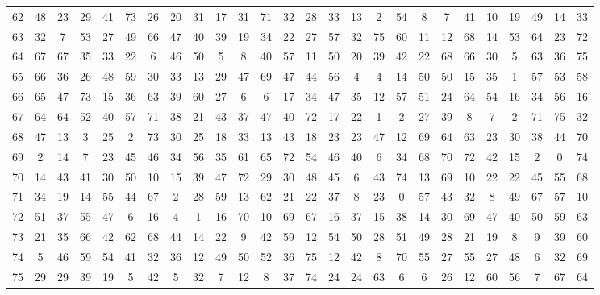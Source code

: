 \begin{table}
\begin{tabular}{c c c c c c c c c c c c c c c c c c c c c c c c c c }
62 & 48 & 23 & 29 & 41 & 73 & 26 & 20 & 31 & 17 & 31 & 71 & 32 & 28 & 33 & 13 & 2 & 54 & 8 & 7 & 41 & 10 & 19 & 49 & 14 & 33 \\
63 & 32 & 7 & 53 & 27 & 49 & 66 & 47 & 40 & 39 & 19 & 34 & 22 & 27 & 57 & 32 & 75 & 60 & 11 & 12 & 68 & 14 & 53 & 64 & 23 & 72 \\
64 & 67 & 67 & 35 & 33 & 22 & 6 & 46 & 50 & 5 & 8 & 40 & 57 & 11 & 50 & 20 & 39 & 42 & 22 & 68 & 66 & 30 & 5 & 63 & 36 & 75 \\
65 & 66 & 36 & 26 & 48 & 59 & 30 & 33 & 13 & 29 & 47 & 69 & 47 & 44 & 56 & 4 & 4 & 14 & 50 & 50 & 15 & 35 & 1 & 57 & 53 & 58 \\
66 & 65 & 47 & 73 & 15 & 36 & 63 & 39 & 60 & 27 & 6 & 6 & 17 & 34 & 47 & 35 & 12 & 57 & 51 & 24 & 64 & 54 & 16 & 34 & 56 & 16 \\
67 & 64 & 64 & 52 & 40 & 57 & 71 & 38 & 21 & 43 & 37 & 47 & 40 & 72 & 17 & 22 & 1 & 2 & 27 & 39 & 8 & 7 & 2 & 71 & 75 & 32 \\
68 & 47 & 13 & 3 & 25 & 2 & 73 & 30 & 25 & 18 & 33 & 13 & 43 & 18 & 23 & 23 & 47 & 12 & 69 & 64 & 63 & 23 & 30 & 38 & 44 & 70 \\
69 & 2 & 14 & 7 & 23 & 45 & 46 & 34 & 56 & 35 & 61 & 65 & 72 & 54 & 46 & 40 & 6 & 34 & 68 & 70 & 72 & 42 & 15 & 2 & 0 & 74 \\
70 & 14 & 43 & 41 & 30 & 50 & 10 & 15 & 39 & 47 & 72 & 29 & 30 & 48 & 45 & 6 & 43 & 74 & 13 & 69 & 10 & 22 & 22 & 45 & 55 & 68 \\
71 & 34 & 19 & 14 & 55 & 44 & 67 & 2 & 28 & 59 & 13 & 62 & 21 & 22 & 37 & 8 & 23 & 0 & 57 & 43 & 32 & 8 & 49 & 67 & 57 & 10 \\
72 & 51 & 37 & 55 & 47 & 6 & 16 & 4 & 1 & 16 & 70 & 10 & 69 & 67 & 16 & 37 & 15 & 38 & 14 & 30 & 69 & 47 & 40 & 50 & 59 & 63 \\
73 & 21 & 35 & 66 & 42 & 62 & 68 & 44 & 14 & 22 & 9 & 42 & 59 & 12 & 54 & 50 & 28 & 51 & 49 & 28 & 21 & 19 & 8 & 9 & 39 & 60 \\
74 & 5 & 46 & 59 & 54 & 41 & 32 & 36 & 12 & 49 & 50 & 52 & 36 & 75 & 12 & 42 & 8 & 70 & 55 & 27 & 55 & 27 & 48 & 6 & 32 & 69 \\
75 & 29 & 29 & 39 & 19 & 5 & 42 & 5 & 32 & 7 & 12 & 8 & 37 & 74 & 24 & 24 & 63 & 6 & 6 & 26 & 12 & 60 & 56 & 7 & 67 & 64 \\
\hline
\end{tabular}
\end{table}